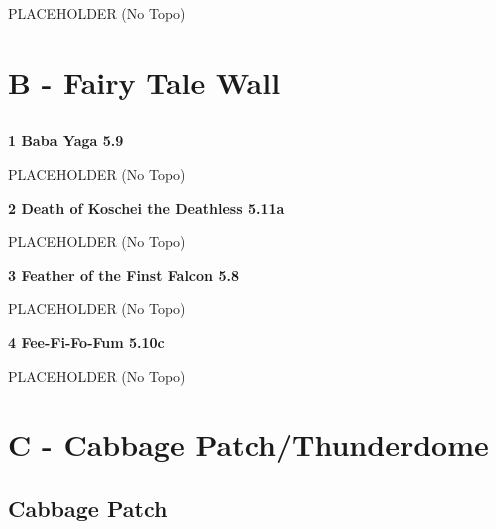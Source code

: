 \begin{multicols}{2}
			\begin{adjustwidth}{0.5cm}{}				
			PLACEHOLDER
				\newline (No Topo) 
			\end{adjustwidth}
\newpage
		\section{B - Fairy Tale Wall}\label{sa:Fairy Tale Wall}
	
	
		\subsection*{}\label{bf:}
			
			\label{rt:Baba Yaga}
\colorbox{green!20}{
\parbox{0.95\linewidth}{
\textbf{
1 Baba Yaga 5.9  
}
}
}

			\begin{adjustwidth}{0.5cm}{}				
			PLACEHOLDER
				\newline (No Topo) 
			\end{adjustwidth}
			\label{rt:Death of Koschei the Deathless}
\colorbox{RoyalBlue!20}{
\parbox{0.95\linewidth}{
\textbf{
2 Death of Koschei the Deathless 5.11a  
}
}
}

			\begin{adjustwidth}{0.5cm}{}				
			PLACEHOLDER
				\newline (No Topo) 
			\end{adjustwidth}
			\label{rt:Feather of the Finst Falcon}
\colorbox{green!20}{
\parbox{0.95\linewidth}{
\textbf{
3 Feather of the Finst Falcon 5.8  
}
}
}

			\begin{adjustwidth}{0.5cm}{}				
			PLACEHOLDER
				\newline (No Topo) 
			\end{adjustwidth}
			\label{rt:Fee-Fi-Fo-Fum}
\colorbox{RoyalBlue!20}{
\parbox{0.95\linewidth}{
\textbf{
4 Fee-Fi-Fo-Fum 5.10c  
}
}
}

			\begin{adjustwidth}{0.5cm}{}				
			PLACEHOLDER
				\newline (No Topo) 
			\end{adjustwidth}
\newpage
		\section{C - Cabbage Patch/Thunderdome}\label{sa:Cabbage Patch/Thunderdome}
	
	
		\subsection*{Cabbage Patch}\label{bf:Cabbage Patch}
			

\end{multicols}
